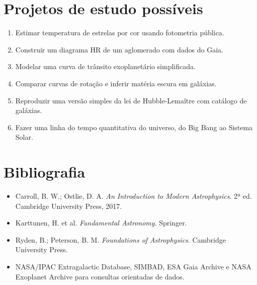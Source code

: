 \documentclass[11pt,a4paper]{article}
\begin{document}
\section*{Projetos de estudo possíveis}
\begin{enumerate}
\item Estimar temperatura de estrelas por cor usando fotometria pública.
\item Construir um diagrama HR de um aglomerado com dados do Gaia.
\item Modelar uma curva de trânsito exoplanetário simplificada.
\item Comparar curvas de rotação e inferir matéria escura em galáxias.
\item Reproduzir uma versão simples da lei de Hubble-Lemaître com catálogo de galáxias.
\item Fazer uma linha do tempo quantitativa do universo, do Big Bang ao Sistema Solar.
\end{enumerate}
\section*{Bibliografia}
\begin{itemize}
\item Carroll, B. W.; Ostlie, D. A. \textit{An Introduction to Modern Astrophysics}. 2ª ed. Cambridge University Press, 2017.
\item Karttunen, H. et al. \textit{Fundamental Astronomy}. Springer.
\item Ryden, B.; Peterson, B. M. \textit{Foundations of Astrophysics}. Cambridge University Press.
\item NASA/IPAC Extragalactic Database, SIMBAD, ESA Gaia Archive e NASA Exoplanet Archive para consultas orientadas de dados.
\end{itemize}
\end{document}
